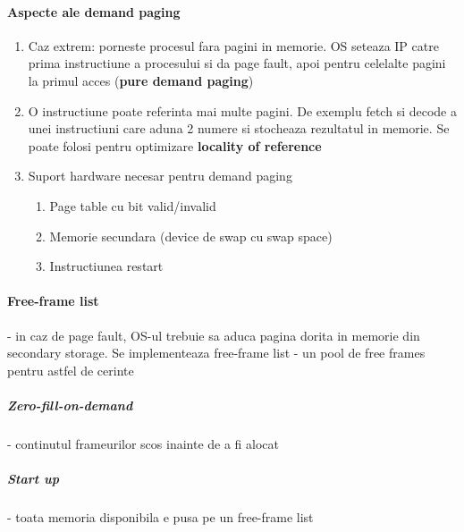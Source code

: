 \documentclass{article}
\begin{document}
\paragraph*{Aspecte ale demand paging}
\begin{enumerate}
    \item Caz extrem: porneste procesul fara pagini in memorie. OS seteaza IP catre prima instructiune a procesului si da page fault, apoi pentru celelalte pagini la primul acces (\textbf{pure demand paging})
    \item O instructiune poate referinta mai multe pagini. De exemplu fetch si decode a unei instructiuni care aduna 2 numere si stocheaza rezultatul in memorie. Se poate folosi pentru optimizare \textbf{locality of reference}
    \item Suport hardware necesar pentru demand paging
    \begin{enumerate}
        \item Page table cu bit valid/invalid
        \item Memorie secundara (device de swap cu swap space)
        \item Instructiunea restart
    \end{enumerate}
\end{enumerate}

\paragraph*{Free-frame list} - in caz de page fault, OS-ul trebuie sa aduca pagina dorita in memorie din secondary storage. Se implementeaza free-frame list - un pool de free frames pentru astfel de cerinte
\subparagraph*{Zero-fill-on-demand} - continutul frameurilor scos inainte de a fi alocat
\subparagraph*{Start up} - toata memoria disponibila e pusa pe un free-frame list
\end{document}
